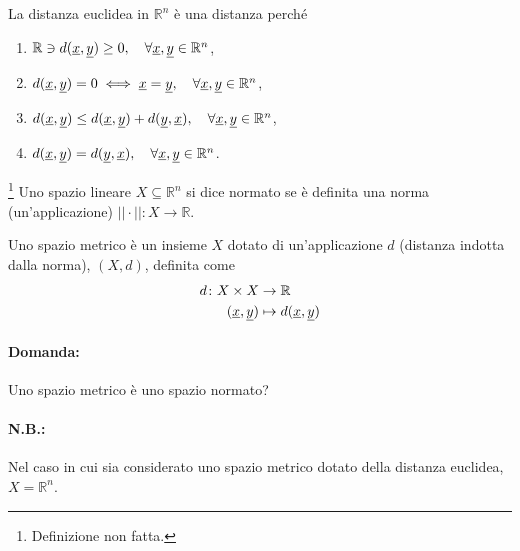 \begin{example}
    La distanza euclidea in $\mathbb R^n$ è una distanza perché
    \begin{enumerate}
        \item $\mathbb R\ni d(\uline x, \uline y)\geq 0,\quad\forall\uline x,\uline y\in\mathbb R^n$,
        \item $d(\uline x,\uline y)=0\iff \uline x=\uline y,\quad\forall\uline x,\uline y\in\mathbb R^n$,
        \item $d(\uline x,\uline y)\leq d(\uline x,\uline y) +d(\uline y,\uline x),\quad\forall\uline x,\uline y\in\mathbb R^n$,
        \item $d(\uline x,\uline y) = d(\uline y, \uline x), \quad\forall\uline x,\uline y\in\mathbb R^n$.
    \end{enumerate}
\end{example}

\begin{definition}\label{def:spazio_normato}\footnote{Definizione non fatta.}
    Uno spazio lineare $X\subseteq \mathbb R^n$ si dice normato se è definita una norma (un'applicazione) $||\cdot||\colon X\rightarrow\mathbb R$.
\end{definition}

\begin{definition}
    Uno spazio metrico è un insieme $X$ dotato di un'applicazione $d$ (distanza indotta dalla norma), $(X,d)$, definita come
    \begin{equation*}
        \begin{aligned}
            d\colon X\times X&\rightarrow\mathbb R\\
            (\uline x,\uline y)&\mapsto d(\uline x,\uline y)
        \end{aligned}
    \end{equation*}
\end{definition}

\paragraph{Domanda:} Uno spazio metrico è uno spazio normato?

\paragraph{N.B.:} Nel caso in cui sia considerato uno spazio metrico dotato della distanza euclidea, $X=\mathbb R^n$.

